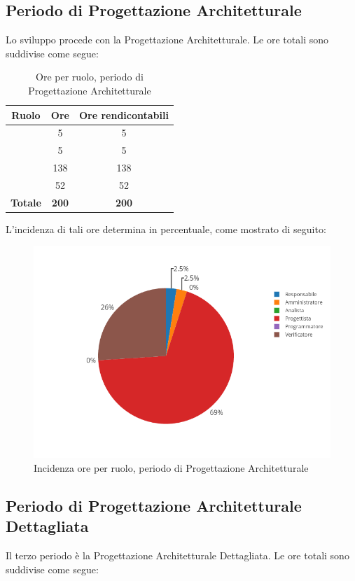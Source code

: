 \subsection{Periodo di Progettazione Architetturale}
Lo sviluppo procede con la Progettazione Architetturale. Le ore totali sono suddivise come segue:

\begin{table}[H]
	\begin{center}
		\begin{tabular}{|c|c|c|}
			\hline
			\textbf{Ruolo}	& \textbf{Ore}	& \textbf{Ore rendicontabili} \\
			\hline
			\Res	&	5	&	5	\\
			\hline
			\Amm	&	5	&	5	\\
			\hline
			\Prog   &	138   &	138	\\
			\hline
			\Ver	&	52	&	52	\\
			\hline
			\textbf{Totale} & \textbf{200} & \textbf{200} \\
			\hline
		\end{tabular}
	\end{center}
	\caption{Ore per ruolo, periodo di Progettazione Architetturale}
\end{table}

L'incidenza di tali ore determina in percentuale, come mostrato di seguito:
\begin{figure}[H]
	\centering
	\includegraphics[scale=0.6]{img/ProgettazioneArchitetturale.png}
	\caption{Incidenza ore per ruolo, periodo di Progettazione Architetturale}
\end{figure}

\subsection{Periodo di Progettazione Architetturale Dettagliata}
Il terzo periodo è la Progettazione Architetturale Dettagliata. Le ore totali sono suddivise come segue:


